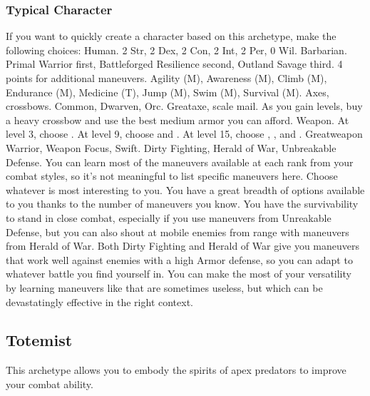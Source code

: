         \subsubsection{Typical Character}
            If you want to quickly create a character based on this archetype, make the following choices:
             Human.
             2 Str, 2 Dex, 2 Con, 2 Int, 2 Per, 0 Wil.
             Barbarian.
             Primal Warrior first, Battleforged Resilience second, Outland Savage third.
             4 points for additional maneuvers.
             Agility (M), Awareness (M), Climb (M), Endurance (M), Medicine (T), Jump (M), Swim (M), Survival (M).
             Axes, crossbows.
             Common, Dwarven, Orc.
             Greataxe, scale mail. As you gain levels, buy a heavy crossbow and use the best medium armor you can afford.
             Weapon.
                At level 3, choose .
                At level 9, choose  and .
                At level 15, choose , , and .
             Greatweapon Warrior, Weapon Focus, Swift.
             Dirty Fighting, Herald of War, Unbreakable Defense.
             You can learn most of the maneuvers available at each rank from your combat styles, so it's not meaningful to list specific maneuvers here.
            Choose whatever is most interesting to you.
             You have a great breadth of options available to you thanks to the number of maneuvers you know.
            You have the survivability to stand in close combat, especially if you use maneuvers from Unreakable Defense, but you can also shout at mobile enemies from range with maneuvers from Herald of War.
            Both Dirty Fighting and Herald of War give you maneuvers that work well against enemies with a high Armor defense, so you can adapt to whatever battle you find yourself in.
            You can make the most of your versatility by learning maneuvers like  that are sometimes useless, but which can be devastatingly effective in the right context.

    \newpage
    \subsection{Totemist}
        This archetype allows you to embody the spirits of apex predators to improve your combat ability.

